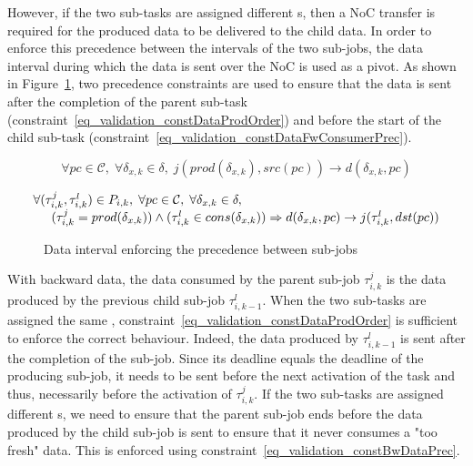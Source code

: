 \documentclass[main.tex]{subfiles}
\begin{document}
However, if the two sub-tasks are assigned different \PN{}s, then a NoC transfer is required for the produced data to be delivered to the child data. In order to enforce this precedence between the intervals of the two sub-jobs, the data interval during which the data is sent over the NoC is used as a pivot. As shown in Figure~\ref{fig_validation_constFwDataPrec}, two precedence constraints are used to ensure that the data is sent after the completion of the parent sub-task (constraint~\ref{eq_validation_constDataProdOrder}) and before the start of the child sub-task (constraint~\ref{eq_validation_constDataFwConsumerPrec}). 

\begin{equation}
    \label{eq_validation_constDataProdOrder}
    \forall pc \in \mathcal{C} , \; \forall \delta_{x,k} \in \delta , \;
    j(prod(\delta_{x,k}) , src(pc)) \to d( \delta_{x,k} , pc )   
\end{equation}

\begin{equation}
    \label{eq_validation_constDataFwConsumerPrec}
    \begin{array}{l}
        \forall (\tau_{i,k}^j , \tau_{i,k}^l) \in P_{i,k}, \; \forall pc \in \mathcal{C} , \; \forall \delta_{x,k} \in \delta , \;  \\
        \hspace{5mm} (\tau_{i,k}^j = prod(\delta_{x,k})) \land (\tau_{i,k}^l \in cons(\delta_{x,k})) 
        \Rightarrow d( \delta_{x,k} , pc ) \to j(\tau_{i,k}^l , dst(pc)) 
    \end{array}
\end{equation}

\begin{figure}
    \centering
    \scalebox{0.9}{}
    \caption{Data interval enforcing the precedence between sub-jobs}
    \label{fig_validation_constFwDataPrec}
\end{figure}

With backward data, the data consumed by the parent sub-job $\tau_{i,k}^j$ is the data produced by the previous child sub-job $\tau_{i,k-1}^l$. When the two sub-tasks are assigned the same \PN{}, constraint~\ref{eq_validation_constDataProdOrder} is sufficient to enforce the correct behaviour. Indeed, the data produced by $\tau_{i,k-1}^l$ is sent after the completion of the sub-job. Since its deadline equals the deadline of the producing sub-job, it needs to be sent before the next activation of the task and thus, necessarily before the activation of $\tau_{i,k}^j$. If the two sub-tasks are assigned different \PN{}s, we need to ensure that the parent sub-job ends before the data produced by the child sub-job is sent to ensure that it never consumes a "too fresh" data. This is enforced using constraint~\ref{eq_validation_constBwDataPrec}.
\end{document}
